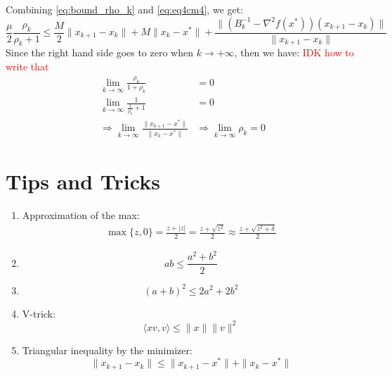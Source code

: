 \documentclass[12pt, openany]{report}
\theoremstyle{definition}
\begin{document}
Combining \eqref{eq:bound_rho_k} and \eqref{eq:eq4cm4}, we get:
\begin{equation}
	\frac{\mu}{2} \frac{\rho_k}{\rho_k + 1} \leq \frac{M}{2} \|x_{k+1}-x_k\| + M \|x_k-x^*\| + \frac{\|\left(B^{-1}_k - \nabla^2f(x^*)\right) (x_{k+1}-x_k)\|}{\|x_{k+1}-x_k\|}
\end{equation}
Since the right hand side goes to zero when $k \to +\infty$, then we have:
\textcolor{red}{IDK how to write that}
\begin{equation}
	\begin{aligned}
		\lim_{k \to \infty} \frac{\rho_k}{1 + \rho_k} &= 0\\
		\lim_{k \to \infty} \frac{1}{\frac{1}{\rho_k} + 1} &= 0\\
		\Rightarrow \lim_{k \to \infty} \frac{\|x_{k+1}-x^*\|}{\|x_k-x^*\|} &\Rightarrow \lim_{k \to \infty} \rho_k = 0  
	\end{aligned}
\end{equation}

\chapter{Tips and Tricks}\label{chap:tricks}
\begin{enumerate}
	\item Approximation of the max:
	\begin{equation}\label{eq:approx_max}
		\begin{aligned}
			\max\{z,0\} = \frac{z+|z|}{2} = \frac{z + \sqrt{z^2}}{2} \approx \frac{z + \sqrt{z^2 + \delta}}{2}
		\end{aligned}	
	\end{equation}
	\item \begin{equation}\label{eq:sq1}
		ab \leq \frac{a^2+b^2}{2}	
	\end{equation}
	\item \begin{equation}\label{eq:sq2}
		(a+b)^2 \leq 2a^2+2b^2
	\end{equation}
	\item V-trick:
	\begin{equation}\label{eq:vtrick}
		\langle xv,v\rangle \leq \|x\|\|v\|^2
	\end{equation}
	\item Triangular inequality by the minimizer: 
	\begin{equation}\label{eq:triangular_inequality_by_min}
		\|x_{k+1}-x_k\| \leq \|x_{k+1}-x^*\|+\|x_k-x^*\|
	\end{equation}
\end{enumerate}
\end{document}
